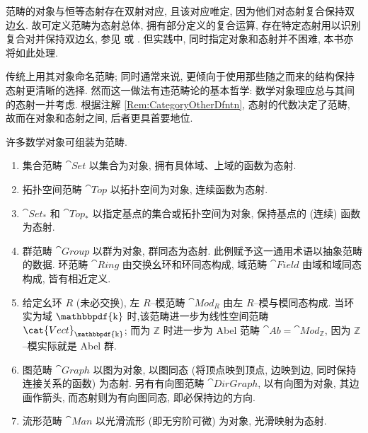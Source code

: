 \begin{remark}\label{Rem:CategoryOtherDfntn}
    范畴的对象与恒等态射存在双射对应, 且该对应唯定, 因为他们对态射复合保持双边幺. 故可定义范畴为态射总体, 拥有部分定义的复合运算, 存在特定态射用以识别复合对并保持双边幺, 参见 \cite{Ehr65} 或 \cite{FS90}. 但实践中, 同时指定对象和态射并不困难, 本书亦将如此处理.
\end{remark}
\par 传统上用其对象命名范畴; 同时通常来说, 更倾向于使用那些随之而来的结构保持态射更清晰的选择. 然而这一做法有违范畴论的基本哲学: 数学对象理应总与其间的态射一并考虑. 根据注解 \ref{Rem:CategoryOtherDfntn}, 态射的代数决定了范畴, 故而在对象和态射之间, 后者更具首要地位.

\begin{example}\label{Expl:Concrete.Category}
    许多数学对象可组装为范畴.
    \begin{enumerate}[label={(\roman*)}, ref = {(\roman*)}]
        \item 集合范畴 \(\cat{Set}\) 以集合为对象, 拥有具体域、上域的函数为态射.
        \item 拓扑空间范畴 \(\cat{Top}\) 以拓扑空间为对象, 连续函数为态射.
        \item \(\cat{Set}_*\) 和 \(\cat{Top}_*\) 以指定基点的集合或拓扑空间为对象, 保持基点的 (连续) 函数为态射.
        \item 群范畴 \(\cat{Group}\) 以群为对象, 群同态为态射. 此例赋予这一通用术语以抽象范畴的数据. 环范畴 \(\cat{Ring}\) 由交换幺环和环同态构成, 域范畴 \(\cat{Field}\) 由域和域同态构成, 皆有相近定义.
        \item 给定幺环 \(R\) (未必交换), 左 \(R\)--模范畴 \(\cat{Mod}_R\) 由左 \(R\)--模与模同态构成. 当环实为域 \(\mathbbpdf{\mathrm k}\) 时,该范畴进一步为线性空间范畴 \(\cat{Vect}_{\mathbbpdf{\mathrm k}}\); 而为 \(\mathbb Z\) 时进一步为 Abel 范畴 \(\cat{Ab} =\cat{Mod}_{\mathbb Z}\), 因为 \(\mathbb Z\)--模实际就是 Abel 群.
        \item 图范畴 \(\cat{Graph}\) 以图为对象, 以图同态 (将顶点映到顶点, 边映到边, 同时保持连接关系的函数) 为态射. 另有有向图范畴 \(\cat{DirGraph}\), 以有向图为对象, 其边画作箭头, 而态射则为有向图同态, 即必保持边的方向.
        \item 流形范畴 \(\cat{Man}\) 以光滑流形 (即无穷阶可微) 为对象, 光滑映射为态射.

\end{enumerate}
\end{example}
